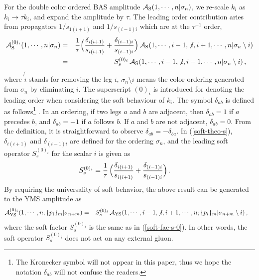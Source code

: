 \documentclass[preprint,showpacs,onecolumn,nofootinbib]{revtex4}
\newcommand{\bea}{\begin{eqnarray}}
\newcommand{\eea}{\end{eqnarray}}
\newcommand{\nn}{\nonumber \\}
\def\eref#1{(\ref{#1})}
\begin{document}
For the double color ordered BAS amplitude ${\cal A}_{\rm S}(1,\cdots,n|\sigma_n)$, we re-scale $k_i$
as $k_i\to\tau k_i$, and expand the amplitude by $\tau$. The leading order contribution aries from propagators $1/s_{1(i+1)}$
and $1/ s_{(i-1)i}$ which are at the $\tau^{-1}$ order,
%
\bea
{\cal A}^{(0)_i}_{\rm S}(1,\cdots,n|\sigma_n)&=&{1\over \tau}\Big({\delta_{i(i+1)}\over s_{i(i+1)}}+{\delta_{(i-1)i}\over s_{(i-1)i}}\Big)\,
{\cal A}_{\rm S}(1,\cdots,i-1,\not{i},i+1,\cdots,n|\sigma_n\setminus i)\nn
&=&S^{(0)_i}_s\,{\cal A}_{\rm S}(1,\cdots,i-1,\not{i},i+1,\cdots,n|\sigma_n\setminus i)\,,~~~\label{soft-theo-s}
\eea
%
where $\not{i}$ stands for removing the leg $i$, $\sigma_n\setminus i$ means the color ordering generated from $\sigma_n$ by eliminating $i$. The superscript $(0)_i$ is introduced for denoting the leading order when considering the soft behaviour of $k_i$. The symbol $\delta_{ab}$ is defined
as follows\footnote{The Kronecker symbol will not appear in this paper, thus we hope the notation $\delta_{ab}$ will not confuse the readers.} \cite{Zhou:2022orv}. In an ordering, if two legs $a$ and $b$ are adjacent, then $\delta_{ab}=1$ if $a$ precedes $b$, and $\delta_{ab}=-1$ if $a$ follows $b$. If $a$ and $b$ are not adjacent, $\delta_{ab}=0$. From the definition, it is straightforward to observe $\delta_{ab}=-\delta_{ba}$. In \eref{soft-theo-s}, $\delta_{i(i+1)}$ and $\delta_{(i-1)i}$ are defined for the ordering $\sigma_n$, and the leading soft operator $S^{(0)_i}_s$ for the scalar $i$ is given as 
%
\bea
S^{(0)_i}_s={1\over \tau}\,\Big({\delta_{i(i+1)}\over s_{i(i+1)}}+{\delta_{(i-1)i}\over s_{(i-1)i}}\Big)\,.~~~~\label{soft-fac-s-0}
\eea
%
By requiring the universality of soft behavior, the above result can be generated to the YMS amplitude as \cite{Zhou:2022orv}
%
\bea
{\cal A}^{(0)_i}_{\rm YS}(1,\cdots,n;\{p_i\}_m|\sigma_{n+m})
&=&S^{(0)_i}_s\,{\cal A}_{\rm YS}(1,\cdots,i-1,\not{i},i+1,\cdots,n;\{p_i\}_m|\sigma_{n+m}\setminus i)\,,~~~\label{soft-theo-s2}
\eea
%
where the soft factor $S^{(0)_i}_s$ is the same as in \eref{soft-fac-s-0}. In other words, the soft operator $S^{(0)_i}_s$ does not act on any external gluon.
\end{document}
